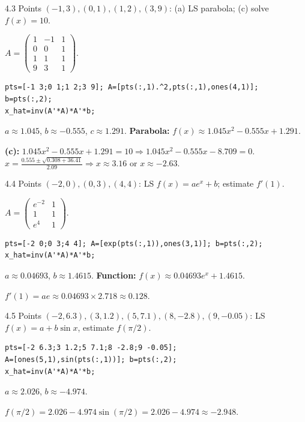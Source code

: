 \begin{exercise}{4.3}
Points $(-1,3),(0,1),(1,2),(3,9)$: (a) LS parabola; (c) solve $f(x)=10$.
\end{exercise}
\begin{solution}
$A=\begin{pmatrix}1&-1&1\\0&0&1\\1&1&1\\9&3&1\end{pmatrix}$.
\begin{lstlisting}
pts=[-1 3;0 1;1 2;3 9]; A=[pts(:,1).^2,pts(:,1),ones(4,1)]; b=pts(:,2);
x_hat=inv(A'*A)*A'*b;
\end{lstlisting}
$a\approx1.045$, $b\approx-0.555$, $c\approx1.291$. \textbf{Parabola:} $f(x)\approx1.045x^2-0.555x+1.291$.

\textbf{(c):} $1.045x^2-0.555x+1.291=10 \Rightarrow 1.045x^2-0.555x-8.709=0$.
$x=\frac{0.555\pm\sqrt{0.308+36.41}}{2.09}\Rightarrow x\approx3.16$ or $x\approx-2.63$.
\end{solution}

\begin{exercise}{4.4}
Points $(-2,0),(0,3),(4,4)$: LS $f(x)=ae^x+b$; estimate $f'(1)$.
\end{exercise}
\begin{solution}
$A=\begin{pmatrix}e^{-2}&1\\1&1\\e^4&1\end{pmatrix}$.
\begin{lstlisting}
pts=[-2 0;0 3;4 4]; A=[exp(pts(:,1)),ones(3,1)]; b=pts(:,2);
x_hat=inv(A'*A)*A'*b;
\end{lstlisting}
$a\approx0.04693$, $b\approx1.4615$. \textbf{Function:} $f(x)\approx0.04693e^x+1.4615$.

$f'(1)=ae\approx0.04693\times2.718\approx0.128$.
\end{solution}

\begin{exercise}{4.5}
Points $(-2,6.3),(3,1.2),(5,7.1),(8,-2.8),(9,-0.05)$: LS $f(x)=a+b\sin x$, estimate $f(\pi/2)$.
\end{exercise}
\begin{solution}
\begin{lstlisting}
pts=[-2 6.3;3 1.2;5 7.1;8 -2.8;9 -0.05];
A=[ones(5,1),sin(pts(:,1))]; b=pts(:,2);
x_hat=inv(A'*A)*A'*b;
\end{lstlisting}
$a\approx2.026$, $b\approx-4.974$.

$f(\pi/2)=2.026-4.974\sin(\pi/2)=2.026-4.974\approx-2.948$.
\end{solution}

